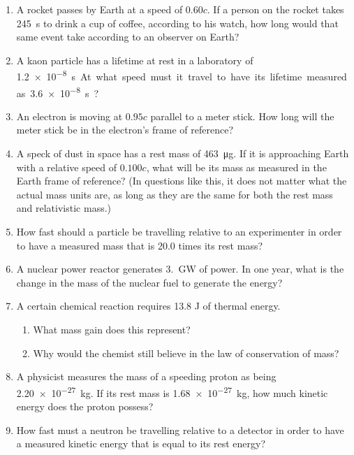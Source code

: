 \begin{enumerate}[itemsep=6pt]
\item A rocket passes by Earth at a speed of $0.60c$. If a person on the rocket
  takes \SI{245}{\second} to drink a cup of coffee, according to his watch, how
  long would that same event take according to an observer on Earth?
  
\item A kaon particle has a lifetime at rest in a laboratory of
  \SI{1.2e-8}\second. At what speed must it travel to have its lifetime
  measured as \SI{3.6e-8}\second?
  
\item An electron is moving at $0.95c$ parallel to a meter stick. How long will
  the meter stick be in the electron's frame of reference?
 
\item A speck of dust in space has a rest mass of \SI{463}{\micro\gram}. If it
  is approaching Earth with a relative speed of $0.100c$, what will be its mass
  as measured in the Earth frame of reference? (In questions like this, it does
  not matter what the actual mass units are, as long as they are the same for
  both the rest mass and relativistic mass.)
  
\item How fast should a particle be travelling relative to an experimenter in
  order to have a measured mass that is 20.0 times its rest mass?

\item A nuclear power reactor generates \SI{3.}{\giga\watt} of power. In
  one year, what is the change in the mass of the nuclear fuel to generate the
  energy?
  
\item A certain chemical reaction requires 13.8 J of thermal energy.
  \begin{enumerate}[itemsep=3pt]
  \item What mass gain does this represent?
  \item Why would the chemist still believe in the law of conservation of
    mass? 
  \end{enumerate}

\item A physicist measures the mass of a speeding proton as being
  \SI{2.20e-27}{\kilo\gram}. If its rest mass is \SI{1.68e-27}{\kilo\gram}, how
  much kinetic energy does the proton possess?
 
\item How fast must a neutron be travelling relative to a detector in order to
  have a measured kinetic energy that is equal to its rest energy?


\end{enumerate}
